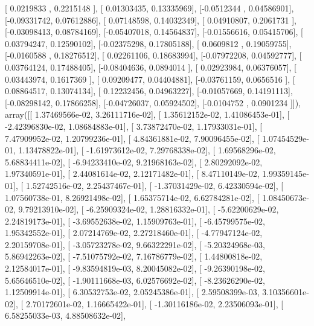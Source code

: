 \documentclass{article}
\begin{document}
       [ 0.0219833 ,  0.2215148 ],
       [ 0.01303435,  0.13335969],
       [-0.0512344 ,  0.04586901],
       [-0.09331742,  0.07612886],
       [ 0.07148598,  0.14032349],
       [ 0.04910807,  0.2061731 ],
       [-0.03098413,  0.08784169],
       [-0.05407018,  0.14564837],
       [-0.01556616,  0.05415706],
       [ 0.03794247,  0.12590102],
       [-0.02375298,  0.17805188],
       [ 0.0609812 ,  0.19059755],
       [-0.0160588 ,  0.18276512],
       [ 0.02261106,  0.18683994],
       [-0.07972208,  0.04592777],
       [ 0.03764124,  0.17488405],
       [-0.08404636,  0.0894014 ],
       [ 0.02923984,  0.06376057],
       [ 0.03443974,  0.1617369 ],
       [ 0.09209477,  0.04404881],
       [-0.03761159,  0.0656516 ],
       [ 0.08864517,  0.13074134],
       [ 0.12232456,  0.04963227],
       [-0.01057669,  0.14191113],
       [-0.08298142,  0.17866258],
       [-0.04726037,  0.05924502],
       [-0.0104752 ,  0.0901234 ]]), array([[  1.37469566e-02,   3.26111716e-02],
       [  1.35612152e-02,   1.41086453e-01],
       [ -2.42396830e-02,   1.08684883e-01],
       [  3.73872470e-02,   1.17933031e-01],
       [  7.47909952e-02,   1.20799236e-01],
       [  4.84361881e-02,   7.90096455e-02],
       [  1.07454529e-01,   1.13478822e-01],
       [ -1.61973612e-02,   7.29768338e-02],
       [  1.69568296e-02,   5.68834411e-02],
       [ -6.94233410e-02,   9.21968163e-02],
       [  2.80292092e-02,   1.97340591e-01],
       [  2.44081614e-02,   2.12171482e-01],
       [  8.47110149e-02,   1.99359145e-01],
       [  1.52742516e-02,   2.25437467e-01],
       [ -1.37031429e-02,   6.42330594e-02],
       [  1.07560738e-01,   8.26921498e-02],
       [  1.65375714e-02,   6.62784281e-02],
       [  1.08450673e-02,   9.79213910e-02],
       [ -6.25909324e-02,   1.28816332e-01],
       [ -5.62200629e-02,   2.24819173e-01],
       [ -3.69552638e-02,   1.15909763e-01],
       [ -6.45799575e-02,   1.95342552e-01],
       [  2.07214769e-02,   2.27218460e-01],
       [ -4.77947124e-02,   2.20159708e-01],
       [ -3.05723278e-02,   9.66322291e-02],
       [ -5.20324968e-03,   5.86942263e-02],
       [ -7.51075792e-02,   7.16786779e-02],
       [  1.44800818e-02,   2.12584017e-01],
       [ -9.83594819e-03,   8.20045082e-02],
       [ -9.26390198e-02,   5.65646510e-02],
       [ -1.90111668e-03,   6.02576692e-02],
       [ -8.23626290e-02,   1.12509914e-01],
       [  6.30532753e-02,   2.05245386e-01],
       [  2.59508399e-03,   3.10356601e-02],
       [  2.70172601e-02,   1.16665422e-01],
       [ -1.30116186e-02,   2.23506093e-01],
       [  6.58255033e-03,   4.88508632e-02],
\end{document}
